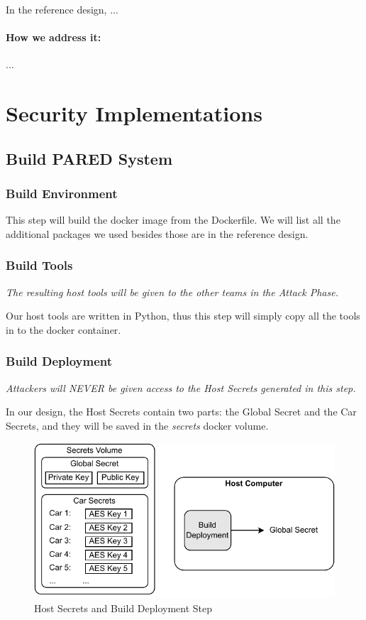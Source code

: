 \documentclass[11pt,oneside,onecolumn,letterpaper]{article}
\begin{document}
In the reference design, ...

\paragraph{How we address it:} ...



\section{Security Implementations}



\subsection{Build PARED System}

\subsubsection{Build Environment}

This step will build the docker image from the Dockerfile. We will list all the additional packages we used besides those are in the reference design.

\subsubsection{Build Tools}

\textit{The resulting host tools will be given to the other teams in the Attack Phase.}

Our host tools are written in Python, thus this step will simply copy all the tools in to the docker container.

\subsubsection{Build Deployment}

\textit{Attackers will NEVER be given access to the Host Secrets generated in this step.}

In our design, the Host Secrets contain two parts: the Global Secret and the Car Secrets, and they will be saved in the \textit{secrets} docker volume.

\begin{figure}[!htbp]
	\begin{centering}
		\includegraphics[width = .6\textwidth]{pic/build_depl.pdf}
		\caption{Host Secrets and Build Deployment Step}
		\label{fig:build_depl}
	\end{centering}
\end{figure}
\end{document}
